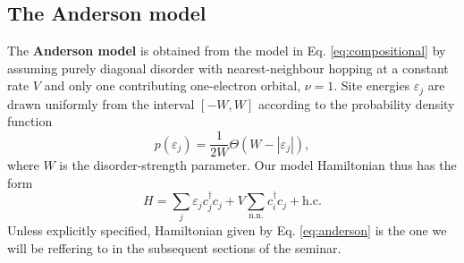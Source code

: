 \documentclass[10pt,a4paper]{article}
\begin{document}
\subsection{The Anderson model}
\label{sec:and}
\noindent The \textbf{Anderson model} is obtained from the model in Eq. \eqref{eq:compositional} by assuming purely diagonal disorder with 
nearest-neighbour hopping at a constant rate $V$ and only one contributing one-electron orbital, $\nu=1$. Site
energies  $\varepsilon_j$ are drawn uniformly from the interval $[-W,W]$ according to the probability density function 
\begin{equation}\label{eq:probability}
p(\varepsilon_j)=\frac{1}{2W}\Theta(W-|\varepsilon_j|),
\end{equation}
where $W$ is the disorder-strength parameter. Our model Hamiltonian thus has the form 
\begin{equation}\label{eq:anderson}
H=\sum\limits_j \varepsilon_j c^\dagger_jc_j + V\sum\limits_{\text{n.n.}} c^\dagger_{i}c_j + \text{h.c.}
\end{equation}
Unless explicitly specified, Hamiltonian given by Eq. \eqref{eq:anderson} is the one we will be reffering to in the subsequent sections of the seminar. \\\\
\noindent 
\end{document}

